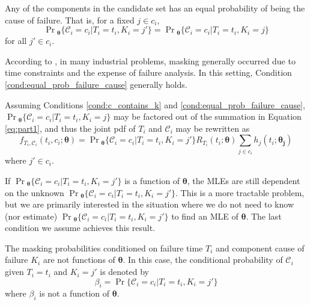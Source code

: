 \documentclass[
]{article}
\begin{document}
\begin{condition}
\label{cond:equal_prob_failure_cause}
Any of the components in the candidate set has an equal probability of being the
cause of failure.
That is, for a fixed $j \in c_i$,
$$
\Pr{}_{\!\boldsymbol{\theta}}\{\mathcal{C}_i=c_i|T_i=t_i,K_i=j'\} =
    \Pr{}_{\!\boldsymbol{\theta}}\{\mathcal{C}_i=c_i|T_i=t_i,K_i=j\}
$$
for all $j' \in c_i$.
\end{condition}

According to \citep{Fran-1991}, in many industrial problems, masking
generally occurred due to time constraints and the expense of failure
analysis. In this setting, Condition \ref{cond:equal_prob_failure_cause}
generally holds.

Assuming Conditions \ref{cond:c_contains_k} and
\ref{cond:equal_prob_failure_cause},
\(\Pr{}_{\!\boldsymbol{\theta}}\{\mathcal{C}_i=c_i|T_i=t_i,K_i=j\}\) may
be factored out of the summation in Equation \eqref{eq:part1}, and thus
the joint pdf of \(T_i\) and \(\mathcal{C}_i\) may be rewritten as \[
f_{T_i,\mathcal{C}_i}(t_i,c_i;\boldsymbol{\theta}) =
    \Pr{}_{\!\boldsymbol{\theta}}\{\mathcal{C}_i=c_i|T_i=t_i,K_i=j'\} R_{T_i}(t_i;\boldsymbol{\theta})
    \sum_{j \in c_i} h_j(t_i;\boldsymbol{\theta_j})
\] where \(j' \in c_i\).

If \(\Pr{}_{\!\boldsymbol{\theta}}\{\mathcal{C}_i=c_i|T_i=t_i,K_i=j'\}\)
is a function of \(\boldsymbol{\theta}\), the MLEs are still dependent
on the unknown
\(\Pr{}_{\!\boldsymbol{\theta}}\{\mathcal{C}_i=c_i|T_i=t_i,K_i=j'\}\).
This is a more tractable problem, but we are primarily interested in the
situation where we do not need to know (nor estimate)
\(\Pr{}_{\!\boldsymbol{\theta}}\{\mathcal{C}_i=c_i|T_i=t_i,K_i=j'\}\) to
find an MLE of \(\boldsymbol{\theta}\). The last condition we assume
achieves this result.

\begin{condition}
\label{cond:masked_indept_theta}
The masking probabilities conditioned on failure time $T_i$ and component cause
of failure $K_i$ are not functions of $\boldsymbol{\theta}$. In this case, the conditional
probability of $\mathcal{C}_i$ given $T_i=t_i$ and $K_i=j'$ is denoted by
$$
\beta_i = \Pr\{\mathcal{C}_i=c_i | T_i=t_i, K_i=j'\}
$$
where $\beta_i$ is not a function of $\boldsymbol{\theta}$.
\end{condition}
\end{document}
